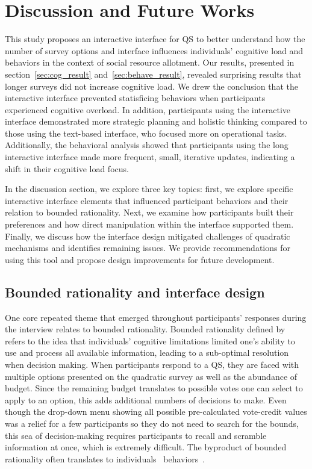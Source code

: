 \section{Discussion and Future Works}
\label{sec:discussion}
This study proposes an interactive interface for QS to better understand how the number of survey options and interface influences individuals' cognitive load and behaviors in the context of social resource allotment. Our results, presented in section~\ref{sec:cog_result} and~\ref{sec:behave_result}, revealed surprising results that longer surveys did not increase cognitive load. We drew the conclusion that the interactive interface prevented statisficing behaviors when participants experienced cognitive overload. In addition, participants using the interactive interface demonstrated more strategic planning and holistic thinking compared to those using the text-based interface, who focused more on operational tasks. Additionally, the behavioral analysis showed that participants using the long interactive interface made more frequent, small, iterative updates, indicating a shift in their cognitive load focus.

In the discussion section, we explore three key topics: first, we explore specific interactive interface elements that influenced participant behaviors and their relation to bounded rationality. Next, we examine how participants built their preferences and how direct manipulation within the interface supported them. Finally, we discuss how the interface design mitigated challenges of quadratic mechanisms and identifies remaining issues. We provide recommendations for using this tool and propose design improvements for future development.

\subsection{Bounded rationality and interface design}
One core repeated theme that emerged throughout participants' responses during the interview relates to bounded rationality. Bounded rationality defined by~\textcite{simonBehavioralModelRational1955} refers to the idea that individuals' cognitive limitations limited one's ability to use and process all available information, leading to a sub-optimal resolution when decision making. When participants respond to a QS, they are faced with multiple options presented on the quadratic survey as well as the abundance of budget. Since the remaining budget translates to possible votes one can select to apply to an option, this adds additional numbers of decisions to make. Even though the drop-down menu showing all possible pre-calculated vote-credit values was a relief for a few participants so they do not need to search for the bounds, this sea of decision-making requires participants to recall and scramble information at once, which is extremely difficult. The byproduct of bounded rationality often translates to individuals~\underline{} behaviors~\cite{gigerenzerReasoningFastFrugal1996}.

